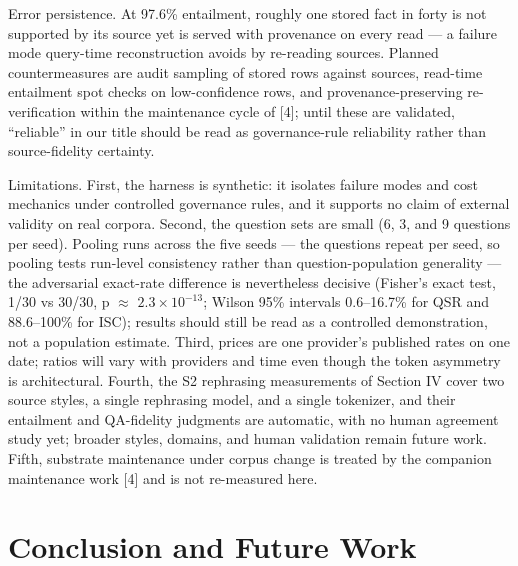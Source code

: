 \documentclass[conference,a4paper]{IEEEtran}
\begin{document}
Error persistence. At 97.6\% entailment, roughly one stored fact in forty is not supported by its source yet is served with provenance on every read --- a failure mode query-time reconstruction avoids by re-reading sources. Planned countermeasures are audit sampling of stored rows against sources, read-time entailment spot checks on low-confidence rows, and provenance-preserving re-verification within the maintenance cycle of [4]; until these are validated, ``reliable'' in our title should be read as governance-rule reliability rather than source-fidelity certainty.

Limitations. First, the harness is synthetic: it isolates failure modes and cost mechanics under controlled governance rules, and it supports no claim of external validity on real corpora. Second, the question sets are small (6, 3, and 9 questions per seed). Pooling runs across the five seeds --- the questions repeat per seed, so pooling tests run-level consistency rather than question-population generality --- the adversarial exact-rate difference is nevertheless decisive (Fisher's exact test, 1/30 vs 30/30, p $\approx$ $2.3\times10^{-13}$; Wilson 95\% intervals 0.6--16.7\% for QSR and 88.6--100\% for ISC); results should still be read as a controlled demonstration, not a population estimate. Third, prices are one provider's published rates on one date; ratios will vary with providers and time even though the token asymmetry is architectural. Fourth, the S2 rephrasing measurements of Section IV cover two source styles, a single rephrasing model, and a single tokenizer, and their entailment and QA-fidelity judgments are automatic, with no human agreement study yet; broader styles, domains, and human validation remain future work. Fifth, substrate maintenance under corpus change is treated by the companion maintenance work [4] and is not re-measured here.

\section{Conclusion and Future Work}
\end{document}
